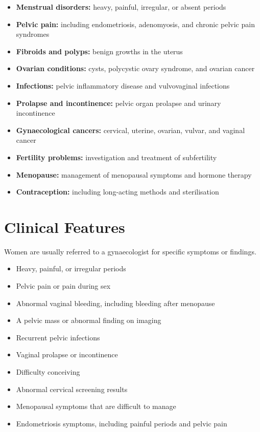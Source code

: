 \begin{itemize}
    \item \textbf{Menstrual disorders:} heavy, painful, irregular, or absent periods
    \item \textbf{Pelvic pain:} including endometriosis, adenomyosis, and chronic pelvic pain syndromes
    \item \textbf{Fibroids and polyps:} benign growths in the uterus
    \item \textbf{Ovarian conditions:} cysts, polycystic ovary syndrome, and ovarian cancer
    \item \textbf{Infections:} pelvic inflammatory disease and vulvovaginal infections
    \item \textbf{Prolapse and incontinence:} pelvic organ prolapse and urinary incontinence
    \item \textbf{Gynaecological cancers:} cervical, uterine, ovarian, vulvar, and vaginal cancer
    \item \textbf{Fertility problems:} investigation and treatment of subfertility
    \item \textbf{Menopause:} management of menopausal symptoms and hormone therapy
    \item \textbf{Contraception:} including long-acting methods and sterilisation
\end{itemize}

\section*{Clinical Features}
Women are usually referred to a gynaecologist for specific symptoms or findings.

\begin{itemize}
    \item Heavy, painful, or irregular periods
    \item Pelvic pain or pain during sex
    \item Abnormal vaginal bleeding, including bleeding after menopause
    \item A pelvic mass or abnormal finding on imaging
    \item Recurrent pelvic infections
    \item Vaginal prolapse or incontinence
    \item Difficulty conceiving
    \item Abnormal cervical screening results
    \item Menopausal symptoms that are difficult to manage
    \item Endometriosis symptoms, including painful periods and pelvic pain
\end{itemize}

